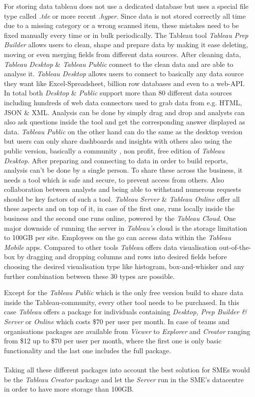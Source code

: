 \documentclass[../paper.tex]{subfiles}
\begin{document}
For storing data tableau does not use a dedicated database but uses a special file type called \textit{.tde} or more recent \textit{.hyper}. Since data is not stored correctly all time due to a missing category or a wrong scanned item, these mistakes need to be fixed manually every time or in bulk periodically. The Tableau tool \textit{Tableau Prep Builder} allows users to clean, shape and prepare data by making it ease deleting, moving or even merging fields from different data sources. After cleaning data, \textit{Tableau Desktop} \& \textit{Tableau Public} connect to the clean data and are able to analyse it. \textit{Tableau Desktop} allows users to connect to basically any data source they want like Excel-Spreadsheet, billion row databases and even to a web-API. In total both \textit{Desktop} \& \textit{Public} support more than 80 different data sources including hundreds of web data connectors used to grab data from e.g. HTML, JSON \& XML.  Analysis can be done by simply drag and drop and analysts can also ask questions inside the tool and get the corresponding answer displayed as data. \textit{Tableau Public} on the other hand can do the same as the desktop version but users can only share dashboards and insights with others also using the public version, basically a community , non profit, free edition of \textit{Tableau Desktop}. After preparing and connecting to data in order to build reports, analysis can't be done by a single person. To share these across the business, it needs a tool which is safe and secure, to prevent access from others. Also collaboration between analysts and being able to withstand numerous requests should be key factors of such a tool. \textit{Tableau Server} \& \textit{Tableau Online} offer all these aspects and on top of it, in case of the first one, runs locally inside the business and the second one runs online, powered by the \textit{Tableau Cloud}. One major downside of running the server in \textit{Tableau's} cloud is the storage limitation to 100GB per site. Employees on the go can access data within the \textit{Tableau Mobile} apps. Compared to other tools \textit{Tableau} offers data visualisation out-of-the-box by dragging and dropping columns and rows into desired fields before choosing the desired visualisation type like histogram, box-and-whisker and any further combination between these 30 types are possible.

Except for the \textit{Tableau Public} which is the only free version build to share data inside the Tableau-community, every other tool needs to be purchased. In this case \textit{Tableau} offers a package for individuals containing \textit{Desktop, Prep Builder \& Server} or \textit{Online} which costs \$70 per user per month. In case of teams and organisations packages are available from \textit{Viewer} to \textit{Explorer} and \textit{Creator} ranging from \$12 up to \$70 per user per month, where the first one is only basic functionality and the last one includes the full package. \\ \\
Taking all these different packages into account the best solution for SMEs would be the \textit{Tableau Creator} package and let the \textit{Server} run in the SME's datacentre in order to have more storage than 100GB.
\end{document}
